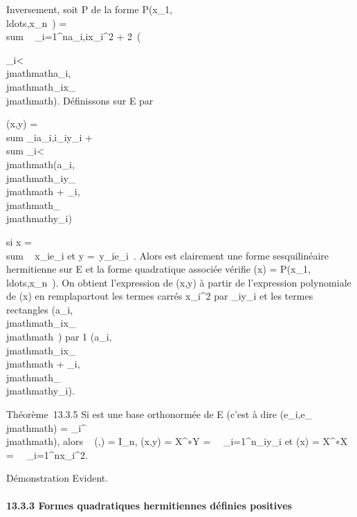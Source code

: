 \documentclass[]{article}
\begin{document}
Inversement, soit P de la forme
P(x_1,\\ldots,x_n~)
= \\sum ~
_i=1^na_i,ix_i^2
+
2\mathrmRe~(\\\sum

_i\textless{}\\jmathmatha_i,\\jmathmath\overlinex_ix_\\jmathmath).
Définissons \phi sur E par

\phi(x,y) = \\sum
_ia_i,i\overlinex_iy_i
+ \\sum
_i\textless{}\\jmathmath(a_i,\\jmathmath\overlinex_iy_\\jmathmath
+
\overlinea_i,\\jmathmath\overlinex_\\jmathmathy_i)

si x = \\sum ~
x_ie_i et y =\
\sum  y_ie_i~. Alors \phi est
clairement une forme sesquilinéaire hermitienne sur E et la forme
quadratique associée vérifie \Phi(x) =
P(x_1,\\ldots,x_n~).
On obtient l'expression de \phi(x,y) à partir de l'expression polynomiale
de \Phi(x) en rempla\ccant partout les termes carrés
x_i^2 par
\overlinex_iy_i et les termes
rectangles
\mathrmRe(a_i,\\jmathmath\overlinex_ix_\\jmathmath~)
par  1 
(a_i,\\jmathmath\overlinex_ix_\\jmathmath +
\overlinea_i,\\jmathmath\overlinex_\\jmathmathy_i).

Théorème~13.3.5 Si  est une base orthonormée de E (c'est à dire
\phi(e_i,e_\\jmathmath) = \delta_i^\\jmathmath), alors
\mathrmMat~ (\phi,) =
I_n, \phi(x,y) = X^∗Y =\
\sum ~
_i=1^n\overlinex_iy_i
et \Phi(x) = X^∗X =\
\sum ~
_i=1^nx_i^2.

Démonstration Evident.

\paragraph{13.3.3 Formes quadratiques hermitiennes définies positives}
\end{document}
